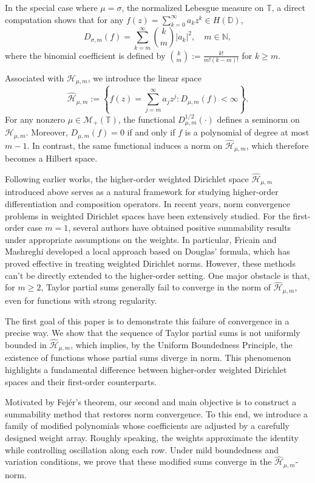 \documentclass[12pt,reqno]{amsart}
\begin{document}
In the special case where $\mu = \sigma$, the normalized Lebesgue measure on $\mathbb{T}$, a direct computation shows that for any
$f(z) = \sum_{k = 0}^\infty a_k z^k \in H(\mathbb{D})$,
\[
D_{\sigma,m}(f) = \sum_{k = m}^{\infty} \binom{k}{m} |a_k|^2,
\quad m \in \mathbb{N},
\]
where the binomial coefficient is defined by
$\binom{k}{m} := \frac{k!}{m!(k - m)!}$ for $k \ge m$.

Associated with $\mathcal{H}_{\mu,m}$, we introduce the linear space
\[
\widehat{\mathcal{H}}_{\mu,m}
:= \left\{
f(z) = \sum_{j = m}^{\infty} a_j z^j : D_{\mu,m}(f) < \infty
\right\}.
\]
For any nonzero $\mu \in \mathcal{M}_+(\mathbb{T})$, the functional $D_{\mu,m}^{1/2}(\cdot)$ defines a seminorm on $\mathcal{H}_{\mu,m}$.
Moreover, $D_{\mu,m}(f) = 0$ if and only if $f$ is a polynomial of degree at most $m-1$.
In contrast, the same functional induces a norm on $\widehat{\mathcal{H}}_{\mu,m}$, which therefore becomes a Hilbert space.

Following earlier works, the higher-order weighted Dirichlet space
$\widehat{\mathcal{H}}_{\mu,m}$ introduced above
serves as a natural framework for studying higher-order differentiation
and composition operators. In recent years, norm convergence problems in weighted Dirichlet spaces have been extensively studied.
For the first-order case $m=1$, several authors have obtained positive summability results under appropriate assumptions on the weights.
In particular, Fricain and Mashreghi developed a local approach based on Douglas' formula, which has proved effective in treating weighted Dirichlet norms.
However, these methods can't be directly extended to the higher-order setting.
One major obstacle is that, for $m \ge 2$, Taylor partial sums generally fail to converge in the norm of $\widehat{\mathcal{H}}_{\mu,m}$, even for functions with strong regularity.

The first goal of this paper is to demonstrate this failure of convergence in a precise way.
We show that the sequence of Taylor partial sums is not uniformly bounded in $\widehat{\mathcal{H}}_{\mu,m}$, which implies, by the Uniform Boundedness Principle, the existence of functions whose partial sums diverge in norm.
This phenomenon highlights a fundamental difference between higher-order weighted Dirichlet spaces and their first-order counterparts.

Motivated by Fej\'er's theorem, our second and main objective is to construct a summability method that restores norm convergence.
To this end, we introduce a family of modified polynomials whose coefficients are adjusted by a carefully designed weight array.
Roughly speaking, the weights approximate the identity while controlling oscillation along each row.
Under mild boundedness and variation conditions, we prove that these modified sums converge in the $\widehat{\mathcal{H}}_{\mu,m}$-norm.
\end{document}
